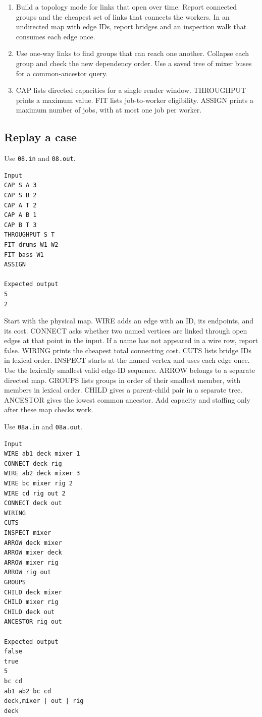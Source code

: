 \documentclass[11pt,letterpaper]{article}
\begin{document}
\begin{enumerate}
\item Build a topology mode for links that open over time. Report connected groups and the cheapest set of links that connects the workers. In an undirected map with edge IDs, report bridges and an inspection walk that consumes each edge once.
\item Use one-way links to find groups that can reach one another. Collapse each group and check the new dependency order. Use a saved tree of mixer buses for a common-ancestor query.
\item CAP lists directed capacities for a single render window. THROUGHPUT prints a maximum value. FIT lists job-to-worker eligibility. ASSIGN prints a maximum number of jobs, with at most one job per worker.
\end{enumerate}

\subsection*{Replay a case}

Use \texttt{08.in} and \texttt{08.out}.

\begin{samepage}
\small
\begin{verbatim}
Input
CAP S A 3
CAP S B 2
CAP A T 2
CAP A B 1
CAP B T 3
THROUGHPUT S T
FIT drums W1 W2
FIT bass W1
ASSIGN

Expected output
5
2
\end{verbatim}
\end{samepage}

Start with the physical map. WIRE adds an edge with an ID, its endpoints, and its cost. CONNECT asks whether two named vertices are linked through open edges at that point in the input. If a name has not appeared in a wire row, report false. WIRING prints the cheapest total connecting cost. CUTS lists bridge IDs in lexical order. INSPECT starts at the named vertex and uses each edge once. Use the lexically smallest valid edge-ID sequence. ARROW belongs to a separate directed map. GROUPS lists groups in order of their smallest member, with members in lexical order. CHILD gives a parent-child pair in a separate tree. ANCESTOR gives the lowest common ancestor. Add capacity and staffing only after these map checks work.

Use \texttt{08a.in} and \texttt{08a.out}.

\begin{samepage}
\small
\begin{verbatim}
Input
WIRE ab1 deck mixer 1
CONNECT deck rig
WIRE ab2 deck mixer 3
WIRE bc mixer rig 2
WIRE cd rig out 2
CONNECT deck out
WIRING
CUTS
INSPECT mixer
ARROW deck mixer
ARROW mixer deck
ARROW mixer rig
ARROW rig out
GROUPS
CHILD deck mixer
CHILD mixer rig
CHILD deck out
ANCESTOR rig out

Expected output
false
true
5
bc cd
ab1 ab2 bc cd
deck,mixer | out | rig
deck
\end{verbatim}
\end{samepage}
\end{document}
